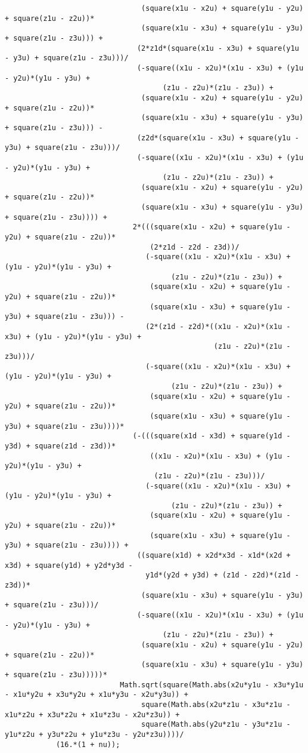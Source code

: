 \begin{lstlisting}
								(square(x1u - x2u) + square(y1u - y2u) + square(z1u - z2u))*
								(square(x1u - x3u) + square(y1u - y3u) + square(z1u - z3u))) + 
							   (2*z1d*(square(x1u - x3u) + square(y1u - y3u) + square(z1u - z3u)))/
							   (-square((x1u - x2u)*(x1u - x3u) + (y1u - y2u)*(y1u - y3u) + 
									 (z1u - z2u)*(z1u - z3u)) + 
								(square(x1u - x2u) + square(y1u - y2u) + square(z1u - z2u))*
								(square(x1u - x3u) + square(y1u - y3u) + square(z1u - z3u))) - 
							   (z2d*(square(x1u - x3u) + square(y1u - y3u) + square(z1u - z3u)))/
							   (-square((x1u - x2u)*(x1u - x3u) + (y1u - y2u)*(y1u - y3u) + 
									 (z1u - z2u)*(z1u - z3u)) + 
								(square(x1u - x2u) + square(y1u - y2u) + square(z1u - z2u))*
								(square(x1u - x3u) + square(y1u - y3u) + square(z1u - z3u)))) + 
							  2*(((square(x1u - x2u) + square(y1u - y2u) + square(z1u - z2u))*
								  (2*z1d - z2d - z3d))/
								 (-square((x1u - x2u)*(x1u - x3u) + (y1u - y2u)*(y1u - y3u) + 
									   (z1u - z2u)*(z1u - z3u)) + 
								  (square(x1u - x2u) + square(y1u - y2u) + square(z1u - z2u))*
								  (square(x1u - x3u) + square(y1u - y3u) + square(z1u - z3u))) - 
								 (2*(z1d - z2d)*((x1u - x2u)*(x1u - x3u) + (y1u - y2u)*(y1u - y3u) + 
												 (z1u - z2u)*(z1u - z3u)))/
								 (-square((x1u - x2u)*(x1u - x3u) + (y1u - y2u)*(y1u - y3u) + 
									   (z1u - z2u)*(z1u - z3u)) + 
								  (square(x1u - x2u) + square(y1u - y2u) + square(z1u - z2u))*
								  (square(x1u - x3u) + square(y1u - y3u) + square(z1u - z3u))))*
							  (-(((square(x1d - x3d) + square(y1d - y3d) + square(z1d - z3d))*
								  ((x1u - x2u)*(x1u - x3u) + (y1u - y2u)*(y1u - y3u) + 
								   (z1u - z2u)*(z1u - z3u)))/
								 (-square((x1u - x2u)*(x1u - x3u) + (y1u - y2u)*(y1u - y3u) + 
									   (z1u - z2u)*(z1u - z3u)) + 
								  (square(x1u - x2u) + square(y1u - y2u) + square(z1u - z2u))*
								  (square(x1u - x3u) + square(y1u - y3u) + square(z1u - z3u)))) + 
							   ((square(x1d) + x2d*x3d - x1d*(x2d + x3d) + square(y1d) + y2d*y3d - 
								 y1d*(y2d + y3d) + (z1d - z2d)*(z1d - z3d))*
								(square(x1u - x3u) + square(y1u - y3u) + square(z1u - z3u)))/
							   (-square((x1u - x2u)*(x1u - x3u) + (y1u - y2u)*(y1u - y3u) + 
									 (z1u - z2u)*(z1u - z3u)) + 
								(square(x1u - x2u) + square(y1u - y2u) + square(z1u - z2u))*
								(square(x1u - x3u) + square(y1u - y3u) + square(z1u - z3u)))))*
						   Math.sqrt(square(Math.abs(x2u*y1u - x3u*y1u - x1u*y2u + x3u*y2u + x1u*y3u - x2u*y3u)) + 
								square(Math.abs(x2u*z1u - x3u*z1u - x1u*z2u + x3u*z2u + x1u*z3u - x2u*z3u)) + 
								square(Math.abs(y2u*z1u - y3u*z1u - y1u*z2u + y3u*z2u + y1u*z3u - y2u*z3u))))/
			(16.*(1 + nu));
			

\end{lstlisting}
